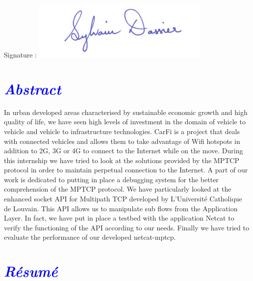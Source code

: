 \documentclass[a4paper,11pt]{article}
\begin{document}
	\vspace{-1cm}
	\hspace{5cm}
	Signature : \includegraphics[scale=0.5]{pictures/signa.jpg}
	
	\clearpage


	\section*{\Huge \textcolor{blue}{\textit{Abstract}}}
	
		\begin{description}
		
			\item \hspace{2cm} In urban developed areas characterised by sustainable economic growth and high quality of life, we have seen high levels of investment in the domain of vehicle to vehicle and vehicle to infrastructure technologies. CarFi is a project that deals with connected vehicles and allows them to take advantage of Wifi hotspots in addition to 2G, 3G or 4G to connect to the Internet while on the move. During this internship we have tried to look at the solutions provided by the MPTCP protocol in order to maintain perpetual connection to the Internet. A part of our work is dedicated to putting in place a debugging system for the better comprehension of the MPTCP protocol. We have particularly looked at the enhanced socket API for Multipath TCP developed by L'Université Catholique de Louvain. This API allows us to manipulate sub flows from the Application Layer. In fact, we have put in place a testbed with the application Netcat to verify the functioning of the API according to our needs. Finally we have tried to evaluate the performance of our developed netcat-mptcp.
			
		\end{description}
		
	\section*{\Huge \textcolor{blue}{\textit{Résumé}}}
	
\end{document}
